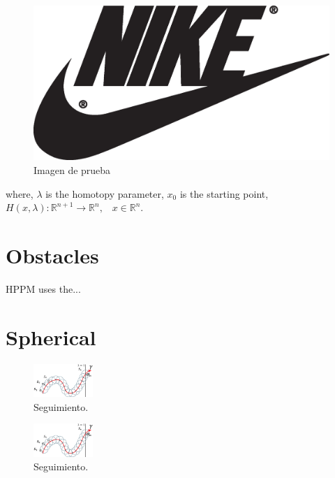 \documentclass[conference]{IEEEtran}
\begin{document}
 \begin{figure}
 	\includegraphics[scale=1]{imagenes/img1.eps}
 	\caption{Imagen de prueba}
 	\label{fig:img1}
 \end{figure}
     
     
     
 where,   $\lambda$ is the homotopy parameter,  $x_0$  is the starting point, $H( x,\lambda) :\mathbb{R}^{n+1}\longrightarrow \mathbb{R}^{n} \text{,} \quad{x} \in\mathbb{R}^{n}$. 
\section{Obstacles}
HPPM uses the...%

\section{Spherical}
 \begin{figure}[H]
\begin{center}
\includegraphics[width=0.2\textwidth]{imagenes/hiper2.eps} 
\caption{ Seguimiento.}
\label{fig:hiper2}
\end{center}
\end{figure}    


  \begin{figure}[H]
\begin{center}
\includegraphics[width=0.2\textwidth]{imagenes/hiper2.eps} 
\caption{ Seguimiento.}
\label{fig:hiper3}
\end{center}
\end{figure}    
  
\end{document}
